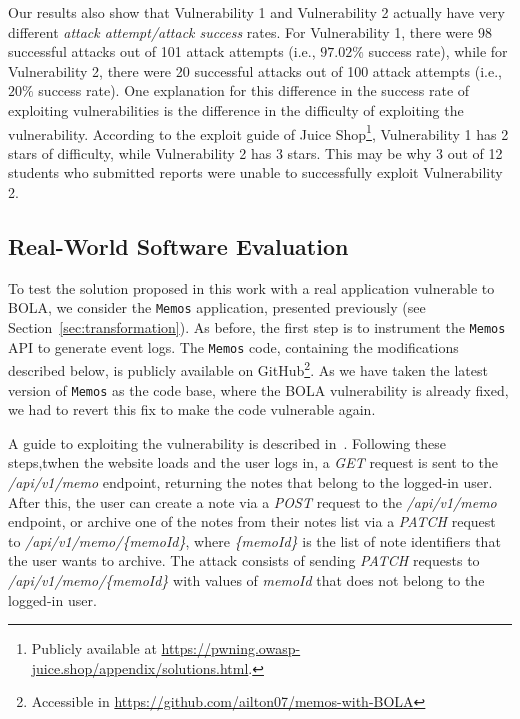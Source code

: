 \begin{table}
\begin{tabular}{c c}
\end{tabular}
\end{table}

Our results also show that {\sc Vulnerability 1} and {\sc Vulnerability 2} actually have very different {\em attack attempt/attack success} rates. For  {\sc Vulnerability 1}, there were 98 successful attacks out of 101 attack attempts (i.e., $97.02\%$ success rate), while for {\sc Vulnerability 2}, there were 20 successful attacks out of 100 attack attempts (i.e., $20\%$ success rate). One explanation for this difference in the success rate of exploiting vulnerabilities is the difference in the difficulty of exploiting the vulnerability. According to the exploit guide of Juice Shop\footnote{Publicly available at \url{https://pwning.owasp-juice.shop/appendix/solutions.html}.}, {\sc Vulnerability 1} has 2 stars of difficulty, while {\sc Vulnerability 2} has 3 stars. This may be why 3 out of 12 students who submitted reports were unable to successfully exploit {\sc Vulnerability 2}.


\subsection{Real-World Software Evaluation}

To test the solution proposed in this work with a real application vulnerable to BOLA, we consider the {\tt Memos} application, presented previously (see Section~\ref{sec:transformation}).
As before, the first step is to instrument the {\tt Memos} API to generate event logs. The {\tt Memos} code, containing the modifications described below, is publicly available on GitHub\footnote{Accessible in \url{https://github.com/ailton07/memos-with-BOLA}}. As we have taken the latest version of {\tt Memos} as the code base, where the BOLA vulnerability is already fixed, we had to revert this fix to make the code vulnerable again.


A guide to exploiting the vulnerability is described in~\cite{huntr2022}. Following these steps,twhen the website loads and the user logs in, a {\em GET} request is sent to the {\em /api/v1/memo} endpoint, returning the notes that belong to the logged-in user. After this, the user can create a note via a {\em POST} request to the {\em /api/v1/memo} endpoint, or archive one of the notes from their notes list via a {\em PATCH} request to {\em /api/v1/memo/\{memoId\}}, where {\em \{memoId\}} is the list of note identifiers that the user wants to archive. The attack consists of sending {\em PATCH} requests to {\em /api/v1/memo/\{memoId\}} with values of {\em memoId} that does not belong to the logged-in user.


